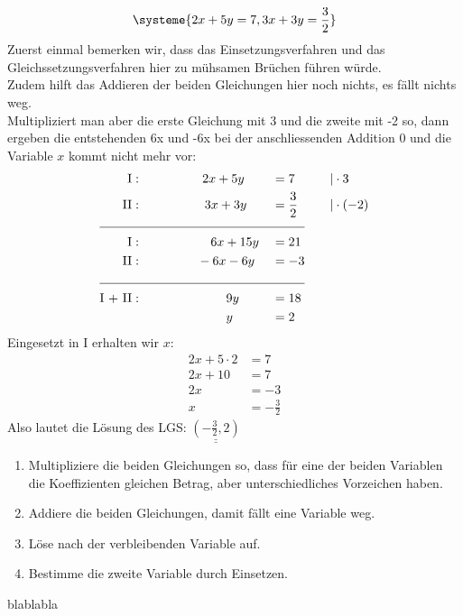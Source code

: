 \documentclass[11pt,oneside]{article}
\begin{document}
\begin{beispiel}
	\begin{equation*}
		\systeme{2x+5y=7, 3x+3y=\frac{3}{2}}
	\end{equation*}
	Zuerst einmal bemerken wir, dass das Einsetzungsverfahren und das Gleichssetzungsverfahren hier zu mühsamen Brüchen führen würde.\\
	Zudem hilft das Addieren der beiden Gleichungen hier noch nichts, es fällt nichts weg.\\
	Multipliziert man aber die erste Gleichung mit 3 und die zweite mit -2 so, dann ergeben die entstehenden 6x und -6x bei der anschliessenden Addition 0 und die Variable $x$ kommt nicht mehr vor:
	\begin{alignat*}{3}
		\text{I}:&\quad \phantom{2xasdfsd}  2x+5y&&=7 && \quad |\cdot 3\\
		\text{II}:&\quad \phantom{x-4yf+}3x+3y&&=\frac{3}{2}&& \quad |\cdot (-2)\\
		\cline{1-4}
		\text{I}:&\quad \phantom{2xx-4y+}  6x+15y&&=21\\
		\text{II}:&\quad \phantom{x-4y+}-6x-6y&&=-3\\
		\cline{1-4}
		\text{I + II}: &\quad  \phantom{x-4y+3x+}9y&&=18\\
		&\quad \phantom{x-4y+3x+}y&&=2\\
	\end{alignat*}
	Eingesetzt in I erhalten wir $x$:
	\begin{align*}
		2x+5\cdot 2&= 7\\
		2x+10&=7\\
		2x&=-3\\
		x&=-\frac{3}{2}
	\end{align*}
	Also lautet die Lösung des LGS: $\underline{\underline{(-\frac{3}{2},2)}}$
\end{beispiel}
\begin{algo}[Additionsverfahren]
	\begin{enumerate}[label=\Roman*)]
		\item Multipliziere die beiden Gleichungen so, dass für eine der beiden Variablen die Koeffizienten gleichen Betrag, aber unterschiedliches Vorzeichen haben.
		\item Addiere die beiden Gleichungen, damit fällt eine Variable weg.
		\item Löse nach der verbleibenden Variable auf.
		\item Bestimme die zweite Variable durch Einsetzen.
	\end{enumerate}
\end{algo}
\begin{aufgabe}
	blablabla
	\vspace{6cm}
\end{aufgabe}
\newpage
\end{document}
